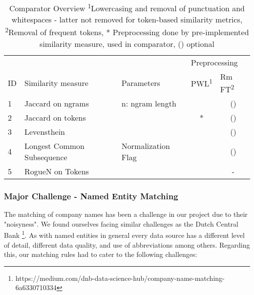\documentclass[11pt,titlepage,oneside,openany]{article}
\begin{document}
\begin{table}[t]
	\small
	\begin{tabular}{lllcc}
		& \multicolumn{2}{l}{}                              & \multicolumn{2}{l}{Preprocessing}                   \\
		ID & Similarity   measure       & Parameters           & \multicolumn{1}{l}{PWL\textsuperscript{1}} & \multicolumn{1}{l}{Rm FT\textsuperscript{2}} \\\hline
		1  & Jaccard on ngrams          & n: ngram   length    & \checked & (\checked)              \\
		2  & Jaccard on tokens          &                      & *                       & (\checked)                       \\
		3  & Levensthein                &                      & \checked & (\checked)                       \\
		4  & Longest Common Subsequence & Normalization   Flag & \checked & (\checked)                       \\
		5  & RogueN on Tokens \cite{lin_rouge_2004} & & \checked & -                      
	\end{tabular}

\caption[Comparator Overview]%
{Comparator Overview \small\medspace\medspace \textsuperscript{1}Lowercasing and removal of punctuation and whitespaces -  latter not removed for token-based similarity metrics, \textsuperscript{2}Removal of frequent tokens, * Preprocessing done by pre-implemented similarity measure, \checked \space used in comparator, (\checked) optional}
\label{table:comparators}

\end{table}

\subsubsection{Major Challenge - Named Entity Matching}

The matching of company names has been a challenge in our project due to their "noisyness". We found ourselves facing similar challenges as the Dutch Central Bank \footnote{https://medium.com/dnb-data-science-hub/company-name-matching-6a6330710334}. %
As with named entities in general every data source has a different level of detail, different data quality, and use of abbreviations among others. Regarding this, our matching rules had to cater to the following challenges:
\end{document}
